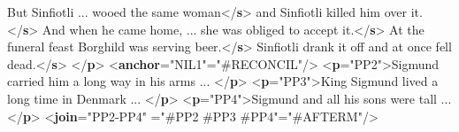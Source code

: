 \begin{shaded}
But Sinfiotli ... wooed the same woman{</\textbf{s}>}\mbox{}\newline 
{}and Sinfiotli killed him over it.{</\textbf{s}>}\mbox{}\newline 
{}\mbox{}\newline 
\hspace*{1em}And when he came home, ... she was obliged to accept it.{</\textbf{s}>}\mbox{}\newline 
\hspace*{1em}At the funeral feast Borghild was serving beer.{</\textbf{s}>}\mbox{}\newline 
\hspace*{1em}Sinfiotli drank it off and at once fell dead.{</\textbf{s}>}\mbox{}\newline 
{}\mbox{}\newline 
{</\textbf{p}>}\mbox{}\newline 
{<\textbf{anchor}\hspace*{1em}{xml:id}="{NIL1}"\hspace*{1em}{ana}="{\#RECONCIL}"/>}\mbox{}\newline 
{<\textbf{p}\hspace*{1em}{xml:id}="{PP2}">}Sigmund carried him a long way in his arms ... {</\textbf{p}>}\mbox{}\newline 
{<\textbf{p}\hspace*{1em}{xml:id}="{PP3}">}King Sigmund lived a long time in Denmark ... {</\textbf{p}>}\mbox{}\newline 
{<\textbf{p}\hspace*{1em}{xml:id}="{PP4}">}Sigmund and all his sons were tall ... {</\textbf{p}>}\mbox{}\newline 
{<\textbf{join}\hspace*{1em}{xml:id}="{PP2-PP4}"\mbox{}\newline 
\hspace*{1em}{target}="{\#PP2 \#PP3 \#PP4}"\hspace*{1em}{ana}="{\#AFTERM}"/>}\end{shaded}\egroup\par \par
